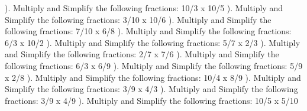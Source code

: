 \documentclass{article}%
\begin{document}
\newline%
). Multiply and Simplify the following fractions: 10/3 x 10/5%
\newline%
\newline%
). Multiply and Simplify the following fractions: 3/10 x 10/6%
\newline%
\newline%
). Multiply and Simplify the following fractions: 7/10 x 6/8%
\newline%
\newline%
). Multiply and Simplify the following fractions: 6/3 x 10/2%
\newline%
\newline%
). Multiply and Simplify the following fractions: 5/7 x 2/3%
\newline%
\newline%
). Multiply and Simplify the following fractions: 2/7 x 7/6%
\newline%
\newline%
). Multiply and Simplify the following fractions: 6/3 x 6/9%
\newline%
\newline%
). Multiply and Simplify the following fractions: 5/9 x 2/8%
\newline%
\newline%
). Multiply and Simplify the following fractions: 10/4 x 8/9%
\newline%
\newline%
). Multiply and Simplify the following fractions: 3/9 x 4/3%
\newline%
\newline%
). Multiply and Simplify the following fractions: 3/9 x 4/9%
\newline%
\newline%
). Multiply and Simplify the following fractions: 10/5 x 5/10%
\newline%
\newline%
\end{document}
